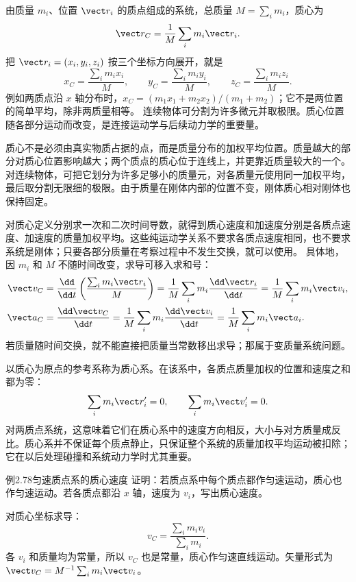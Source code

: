 由质量 $m_i$、位置 $\vect r_i$ 的质点组成的系统，总质量 $M=\sum_i m_i$，质心为
\begin{equation}
\vect r_C=\frac1M\sum_i m_i\vect r_i.
\end{equation}
把 $\vect r_i=(x_i,y_i,z_i)$ 按三个坐标方向展开，就是
\begin{equation}
x_C=\frac{\sum_i m_ix_i}{M},\qquad
y_C=\frac{\sum_i m_iy_i}{M},\qquad
z_C=\frac{\sum_i m_iz_i}{M}.
\end{equation}
例如两质点沿 $x$ 轴分布时，$x_C=(m_1x_1+m_2x_2)/(m_1+m_2)$；它不是两位置的简单平均，除非两质量相等。
连续物体可分割为许多微元并取极限。质心位置随各部分运动而改变，是连接运动学与后续动力学的重要量。

质心不是必须由真实物质占据的点，而是质量分布的加权平均位置。质量越大的部分对质心位置影响越大；两个质点的质心位于连线上，并更靠近质量较大的一个。对连续物体，可把它划分为许多足够小的质量元，对各质量元使用同一加权平均，最后取分割无限细的极限。由于质量在刚体内部的位置不变，刚体质心相对刚体也保持固定。

对质心定义分别求一次和二次时间导数，就得到质心速度和加速度分别是各质点速度、加速度的质量加权平均。这些纯运动学关系不要求各质点速度相同，也不要求系统是刚体；只要各部分质量在考察过程中不发生交换，就可以使用。
具体地，因 $m_i$ 和 $M$ 不随时间改变，求导可移入求和号：
\begin{align}
\vect v_C&=\frac{\dd}{\dd t}\left(\frac{\sum_i m_i\vect r_i}{M}\right)
=\frac1M\sum_i m_i\frac{\dd\vect r_i}{\dd t}
=\frac1M\sum_i m_i\vect v_i,\\
\vect a_C&=\frac{\dd\vect v_C}{\dd t}
=\frac1M\sum_i m_i\frac{\dd\vect v_i}{\dd t}
=\frac1M\sum_i m_i\vect a_i.
\end{align}
若质量随时间交换，就不能直接把质量当常数移出求导；那属于变质量系统问题。

以质心为原点的参考系称为质心系。在该系中，各质点质量加权的位置和速度之和都为零：
\begin{equation}
 \sum_i m_i\vect r_i'=0,\qquad
 \sum_i m_i\vect v_i'=0.
\end{equation}
对两质点系统，这意味着它们在质心系中的速度方向相反，大小与对方质量成反比。质心系并不保证每个质点静止，只保证整个系统的质量加权平均运动被扣除；它在以后处理碰撞和系统动力学时尤其重要。

\begin{origexamplebox}{例2.78\quad 匀速质点系的质心速度}
证明：若质点系中每个质点都作匀速运动，质心也作匀速运动。若各质点都沿 $x$ 轴，速度为 $v_i$，写出质心速度。
\end{origexamplebox}
\begin{xesolution}
对质心坐标求导：
\[
\boxed{v_C=\frac{\sum_i m_iv_i}{\sum_i m_i}}.
\]
各 $v_i$ 和质量均为常量，所以 $v_C$ 也是常量，质心作匀速直线运动。矢量形式为 $\vect v_C=M^{-1}\sum_i m_i\vect v_i$。
\end{xesolution}

